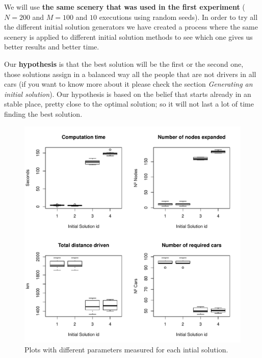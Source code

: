 \documentclass[12]{article}
\begin{document}
We will use \textbf{the same scenery that was used in the first experiment} ($N=200$ and $M=100$ and $10$ executions using random seeds).  In order to try all the different initial solution generators we have created a process where the same scenery is applied to different initial solution methods to see which one gives us better results and better time. 

Our \textbf{hypothesis} is that the best solution will be the first or the second one, those solutions assign in a balanced way all the people that are not drivers in all cars (if you want to know more about it please check the section \textit{Generating an initial solution}). Our hypothesis is based on the belief that starts already in an stable place, pretty close to the optimal solution; so it will not last a lot of time finding the best solution. 

\begin{figure}[H]
\captionsetup{justification=centering}
\centering
\includegraphics[width=\textwidth,height=\textheight, keepaspectratio]{Results/data_2.pdf}
\caption{Plots with different parameters measured for each intial solution.}
\label{operators}
\end{figure}
\end{document}
